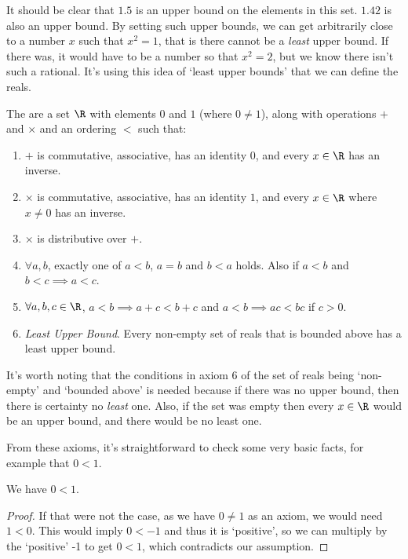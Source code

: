 It should be clear that $1.5$ is an upper bound on the elements in this set. $1.42$ is also an upper bound. By setting such upper bounds, we can get arbitrarily close to a number $x$ such that $x^2 = 1$, that is there cannot be a \emph{least} upper bound. If there was, it would have to be a number so that $x^2 = 2$, but we know there isn't such a rational. 
It's using this idea of `least upper bounds' that we can define the reals.

\begin{definition}
	The  are a set $\R$ with elements $0$ and $1$ (where $0 \neq 1$), along with operations $+$ and $\times$ and an ordering $<$ such that:
	\begin{enumerate}
		\item $+$ is commutative, associative, has an identity $0$, and every $x \in \R$ has an inverse.
		\item $\times$ is commutative, associative, has an identity $1$, and every $x \in \R$ where $x \neq 0$ has an inverse.
		\item $\times$ is distributive over $+$.
		\item $\forall a, b$, exactly one of $a < b$, $a = b$ and $b < a$ holds. Also if $a < b$ and $b < c \implies a < c$.
		\item $\forall a, b, c \in \R$, $a < b \implies a + c < b + c$ and $a < b \implies ac < bc$ if $c > 0$.
		\item \emph{Least Upper Bound}. Every non-empty set of reals that is bounded above has a least upper bound.
	\end{enumerate}
\end{definition}

It's worth noting that the conditions in axiom 6 of the set of reals being `non-empty' and `bounded above' is needed because if there was no upper bound, then there is certainty no \emph{least} one. Also, if the set was empty then every $x \in \R$ would be an upper bound, and there would be no least one.

From these axioms, it's straightforward to check some very basic facts, for example that $0 < 1$.
\begin{example}
	We have $0 < 1$.
\end{example}
\begin{proof}
	If that were not the case, as we have $0 \neq 1$ as an axiom, we would need $1 < 0$. 
	This would imply $0 < -1$ and thus it is `positive', 
	so we can multiply by the `positive' -1 to get $0 < 1$, which contradicts our assumption.
\end{proof}

